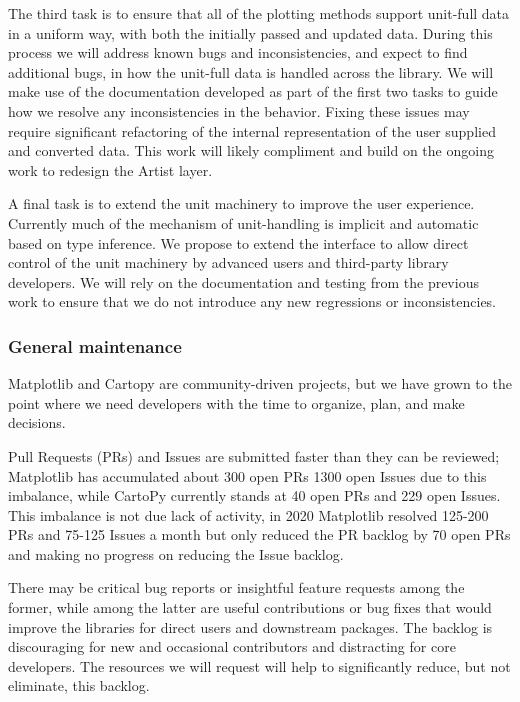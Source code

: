 \documentclass[12pt]{article}
\numberwithin{page}{section}
\begin{document}
The third task is to ensure that all of the plotting methods support
unit-full data in a uniform way, with both the initially passed and
updated data.  During this process we will address known bugs and
inconsistencies, and expect to find additional bugs, in how the
unit-full data is handled across the library.  We will make use of the
documentation developed as part of the first two tasks to guide how we
resolve any inconsistencies in the behavior. Fixing these issues may
require significant refactoring of the internal representation of the
user supplied and converted data.  This work will likely compliment
and build on the ongoing work to redesign the Artist layer.


A final task is to extend the unit machinery to improve the user
experience.  Currently much of the mechanism of unit-handling is
implicit and automatic based on type inference.  We propose to extend
the interface to allow direct control of the unit machinery by
advanced users and third-party library developers.  We will rely
on the documentation and testing from the previous work to ensure that we
do not introduce any new regressions or inconsistencies.



\subsubsection{General maintenance}

Matplotlib and Cartopy are community-driven projects, but we have
grown to the point where we need developers with the time to organize,
plan, and make decisions.

Pull Requests (PRs) and Issues are submitted faster than they can be
reviewed; Matplotlib has accumulated about 300 open PRs 1300 open
Issues due to this imbalance, while CartoPy currently stands at 40
open PRs and 229 open Issues.  This imbalance is not due lack of
activity, in 2020 Matplotlib resolved 125-200 PRs and 75-125 Issues a
month but only reduced the PR backlog by 70 open PRs and making no progress
on reducing the Issue backlog.

There may be critical bug reports or insightful feature requests among
the former, while among the latter are useful contributions or bug
fixes that would improve the libraries for direct users and downstream
packages.  The backlog is discouraging for new and occasional
contributors and distracting for core developers. The resources we
will request will help to significantly reduce, but not eliminate,
this backlog.
\end{document}

